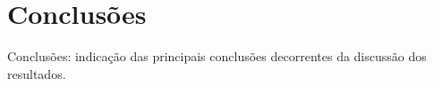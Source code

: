 \section{Conclusões}

Conclusões: indicação das principais conclusões decorrentes da discussão dos resultados.